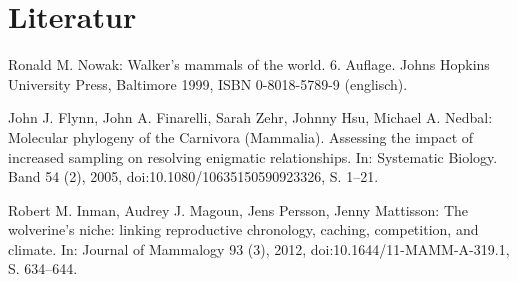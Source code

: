 \documentclass{scrartcl}
\begin{document}
\section{Literatur}

    \item Ronald M. Nowak: Walker’s mammals of the world. 6. Auflage. Johns Hopkins University Press, Baltimore 1999, ISBN 0-8018-5789-9 (englisch).
    \item John J. Flynn, John A. Finarelli, Sarah Zehr, Johnny Hsu, Michael A. Nedbal: Molecular phylogeny of the Carnivora (Mammalia). Assessing the impact of increased sampling on resolving enigmatic relationships. In: Systematic Biology. Band 54 (2), 2005, doi:10.1080/10635150590923326, S. 1–21.
    \item  Robert M. Inman, Audrey J. Magoun, Jens Persson, Jenny Mattisson: The wolverine's niche: linking reproductive chronology, caching, competition, and climate. In: Journal of Mammalogy 93 (3), 2012, doi:10.1644/11-MAMM-A-319.1, S. 634–644.


\end{document}
